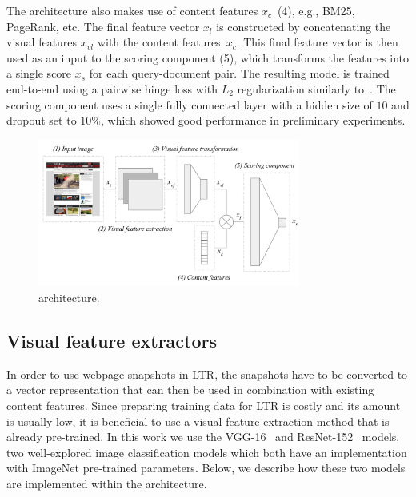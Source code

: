 The \modelname{} architecture also makes use of content features $x_{c}$~(4), e.g., BM25, PageRank, etc.
The final feature vector $x_{l}$ is constructed by concatenating the visual features $x_{vl}$ with the content features~$x_{c}$.
%
This final feature vector is then used as an input to the scoring component (5),
which transforms the features into a single score $x_s$ for each query-document pair.
The resulting model is trained end-to-end using a pairwise hinge loss with $L_2$ regularization similarly to~\cite{fan2017learning}.
The scoring component uses a single fully connected layer with a hidden size of $10$ and dropout set to $10\%$,
which showed good performance in preliminary experiments.



\begin{figure}[t]
\includegraphics[width = 3.4in]{images/multimodelarchitecture.pdf}
\caption{\modelname{} architecture.}
\label{fig:multimodelarchitecture}
\end{figure}

\subsection{Visual feature extractors} \label{sec:visualfeatures}
In order to use webpage snapshots in \ac{LTR}, the snapshots have to be converted to a vector representation that can then be used in combination with existing content features. 
Since preparing training data for \ac{LTR} is costly and its amount is usually low, it is beneficial to use a visual feature extraction method that is already pre-trained.
In this work we use the VGG-16~\cite{simonyan2014very} and ResNet-152~\cite{he2016deep} models, two well-explored image classification models which both have an implementation with ImageNet pre-trained parameters.
Below, we describe how these two models are implemented within the \modelname{} architecture.

